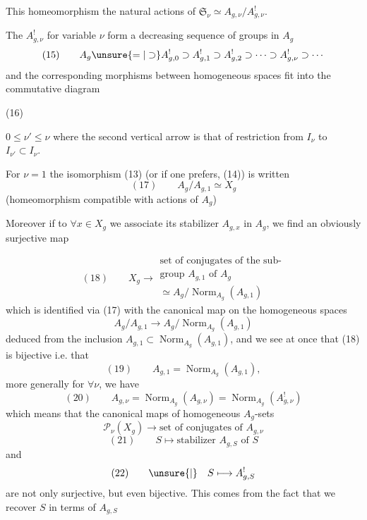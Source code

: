 This homeomorphism  the natural
actions of $\mathfrak S_\nu\simeq A_{g,\nu}/A_{g,\nu}^!$.

The $A_{g,\nu}^!$ for variable $\nu$ form a
decreasing sequence of groups in $A_g$
\[
(15)\qquad A_g\unsure{=|\supset}A_{g,0}^!\supset A_{g,1}^!\supset A_{g,2}^!
\supset\cdots\supset A_{g,\nu}^!\supset\cdots
\]
and the corresponding morphisms
between homogeneous spaces  fit into the
commutative diagram  

\begin{samepage}
(16)\quad
{}
\end{samepage}
\quad $0\leq\nu'\leq\nu$
where the second vertical arrow is that of
restriction from $I_\nu$ to $I_{\nu'}\subset I_\nu$.

For $\nu=1$  the isomorphism (13) (or if one prefers,
(14)) is written
\[
(17)\qquad A_g/A_{g,1}\simeq X_g
\]
(homeomorphism compatible with  actions of $A_g$)

Moreover if to $\forall x\in X_g$ we associate its
stabilizer $A_{g,x}$ in $A_g$, we find an
obviously surjective map

\[
(18)\qquad X_g\longrightarrow
\begin{gathered}
\text{set of conjugates of the sub-}\\
\text{group }A_{g,1}\text{ of }A_g\\
\simeq A_g/\operatorname{Norm}_{A_g}(A_{g,1})
\end{gathered}
\]
which is identified via (17) with the canonical map
on the homogeneous spaces
\[
 A_g/A_{g,1}\longrightarrow A_g/\operatorname{Norm}_{A_g}(A_{g,1})
\]
deduced from the inclusion $A_{g,1}\subset\operatorname{Norm}_{A_g}(A_{g,1})$,
and we see at once that (18) is
bijective i.e. that 
\[
(19)\qquad A_{g,1}=\operatorname{Norm}_{A_g}(A_{g,1}),
\]
more generally for $\forall\nu$, we have
\[
(20)\qquad A_{g,\nu}=\operatorname{Norm}_{A_g}(A_{g,\nu})
=\operatorname{Norm}_{A_g}(A_{g,\nu}^!)
\]
which means that the canonical maps
of homogeneous $A_g$-sets
\[
\mathcal P_\nu(X_g)\longrightarrow\text{set of conjugates of }A_{g,\nu}
\]
\[
(21)\qquad S\longmapsto\text{stabilizer }A_{g,S}\text{ of }S
\]
and
\[
(22)\qquad\unsure{\vert}\quad S\longmapsto A_{g,S}^!
\]
are not only surjective, but even bijective.
This comes from the fact that we recover
$S$ in terms of $A_{g,S}$\deleted{${}^!$} 
  

